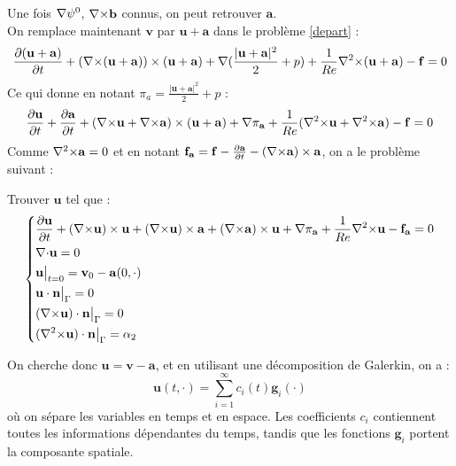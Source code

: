 
Une fois ${\nabla}\psi^0$, ${\nabla\times} \mathbf{b}$ connus, on peut retrouver $\mathbf{a}$.\\

On remplace maintenant $\mathbf{v}$ par $\mathbf{u}+\mathbf{a}$ dans le problème \ref{depart} :
\[ \frac{\partial(\mathbf{u}+\mathbf{a})}{\partial t}+({\nabla\times}(\mathbf{u}+\mathbf{a}))\times(\mathbf{u}+\mathbf{a}) + {\nabla} (\frac{|\mathbf{u}+\mathbf{a}|^2}{2}+p) + \frac{1}{Re}{\nabla^2\times}(\mathbf{u}+\mathbf{a}) - \mathbf{f} = 0 \]
Ce qui donne en notant $\pi_a=\frac{|\mathbf{u}+\mathbf{a}|^2}{2}+p$ :
\[ \frac{\partial \mathbf{u}}{\partial t}+\frac{\partial \mathbf{a}}{\partial t} + ({\nabla\times} \mathbf{u}+{\nabla\times} \mathbf{a})\times(\mathbf{u}+\mathbf{a}) + {\nabla}\pi_{\mathbf{a}} + \frac{1}{Re}({\nabla^2\times} \mathbf{u}+{\nabla^2\times} \mathbf{a}) - \mathbf{f} = 0 \]
Comme ${\nabla^2\times} \mathbf{a} = 0$ et en notant $\mathbf{f_a}=\mathbf{f}-\frac{\partial \mathbf{a}}{\partial t} - ({\nabla\times} \mathbf{a})\times \mathbf{a}$, on a le problème suivant :
\begin{pb}\label{pbu}
Trouver $\mathbf{u}$ tel que :
\begin{equation*}
\left\{\begin{aligned}
&\frac{\partial \mathbf{u}}{\partial t} + ({\nabla\times} \mathbf{u})\times \mathbf{u} + ({\nabla\times} \mathbf{u})\times \mathbf{a} +({\nabla\times} \mathbf{a})\times \mathbf{u} + {\nabla} \pi_{\mathbf{a}} +\frac{1}{Re}{\nabla^2\times}  \mathbf{u} - \mathbf{f_a} = 0\\
&{\nabla\cdot} \mathbf{u} = 0\\
&\mathbf{u}\big\rvert_{t=0} = \mathbf{v}_0 - \mathbf{a}(0,\cdot)\\
&\mathbf{u}\cdot \mathbf{n}{\big\rvert_{\Gamma}} = 0\\
&({\nabla\times} \mathbf{u})\cdot \mathbf{n}{\big\rvert_{\Gamma}} = 0\\
&({\nabla^2\times}  \mathbf{u})\cdot \mathbf{n}{\big\rvert_{\Gamma}} = \alpha_2
\end{aligned}\right.
\end{equation*}\end{pb}

On cherche donc $\mathbf{u}=\mathbf{v}-\mathbf{a}$, et en utilisant une décomposition de Galerkin, on a :
\begin{equation}\label{u}
\mathbf{u}(t,\cdot) = \sum_{i=1}^{\infty} c_i(t)\mathbf{g}_i(\cdot)
\end{equation}
où on sépare les variables en temps et en espace. Les coefficients $c_i$ contiennent toutes les informations dépendantes du temps, tandis que les fonctions $\mathbf{g}_i$ portent la composante spatiale.\\

